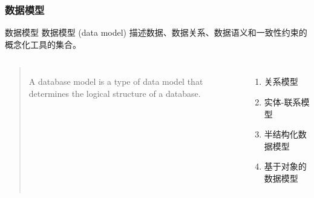 \documentclass[aspectratio=169, 14pt]{beamer}
\begin{document}
\begin{frame}
    \frametitle{数据模型}
    \begin{block}{数据模型}
        数据模型 (data model) 描述数据、数据关系、数据语义和一致性约束的概念化工具的集合。
    \end{block}

    \begin{columns}
        \begin{quote}
            A database model is a type of data model that determines the logical structure of a database.
        \end{quote}
        \begin{enumerate}
            \item 关系模型
            \item 实体-联系模型
            \item 半结构化数据模型
            \item 基于对象的数据模型
        \end{enumerate} 
    \end{columns}

\end{frame}
\end{document}
